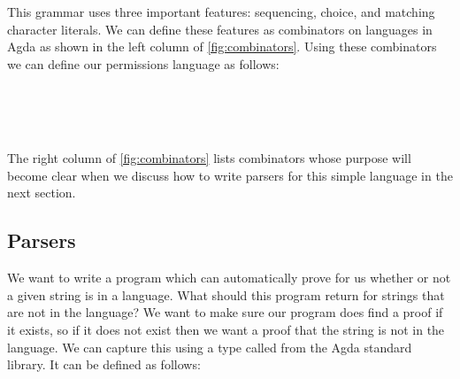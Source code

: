 This grammar uses three important features: sequencing, choice, and matching
character literals. We can define these features as combinators on languages in
Agda as shown in the left column of \cref{fig:combinators}. Using these
combinators we can define our permissions language as follows:
%
\begin{code}[hide]%
%
\>[4]\AgdaSpace{}%
\AgdaSpace{}%
\AgdaSpace{}%
\AgdaSpace{}%
\AgdaSymbol{:}\AgdaSpace{}%
\<%
\end{code}
\begin{code}%
%
\>[4]%
\>[17]\AgdaSymbol{=}\AgdaSpace{}%
\AgdaSpace{}%
\AgdaSpace{}%
\AgdaSpace{}%
\AgdaSpace{}%
\<%
\\
%
\>[4]%
\>[17]\AgdaSymbol{=}\AgdaSpace{}%
\AgdaSpace{}%
\AgdaSpace{}%
\AgdaSpace{}%
\AgdaSpace{}%
\<%
\\
%
\>[4]%
\>[17]\AgdaSymbol{=}\AgdaSpace{}%
\AgdaSpace{}%
\AgdaSpace{}%
\AgdaSpace{}%
\AgdaSpace{}%
\<%
\\
%
\>[4]%
\>[17]\AgdaSymbol{=}\AgdaSpace{}%
\AgdaSpace{}%
\AgdaSpace{}%
\AgdaSpace{}%
\AgdaSpace{}%
\<%
\end{code}

The right column of \cref{fig:combinators} lists combinators whose purpose will become clear when we discuss how to write parsers for this simple language in the next section.

\subsection{Parsers}

We want to write a program which can automatically prove for us whether or not a
given string is in a language. What should this program return for strings that
are not in the language? We want to make sure our program does find a proof if
it exists, so if it does not exist then we want a proof that the string is not
in the language. We can capture this using a type called  from the Agda
standard library. It can be defined as follows:

